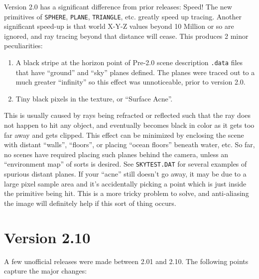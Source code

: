 Version 2.0 has a significant difference from prior releases: Speed!
The new primitives of {\tt SPHERE},
{\tt PLANE}, {\tt TRIANGLE}, etc.
greatly speed up tracing. Another
significant speed-up is that world
X-Y-Z values beyond 10 Million or so are ignored, and ray tracing
beyond that distance will cease.  This produces 2 minor peculiarities:

\begin{enumerate}
\item A black stripe at the horizon point of Pre-2.0 scene description
{\tt .data} files that have ``ground'' and ``sky'' planes defined.  The
planes were traced out to a much greater ``infinity'' so this effect was
unnoticeable, prior to version 2.0.
\item Tiny black pixels in the texture, or ``Surface Acne''.
\end{enumerate}

This is usually caused by rays being refracted or reflected such that
the ray does not happen to hit any object, and eventually becomes
black in color as it gets too far away and gets clipped.  This effect
can be minimized by enclosing the scene with distant ``walls'',
``floors'', or placing ``ocean floors'' beneath water, etc.  So far, no
scenes have required placing such planes behind the camera, unless an
``environment map'' of sorts is desired.  See {\tt SKYTEST.DAT} for several
examples of spurious distant planes.  If your ``acne'' still doesn't go
away, it may be due to a large pixel sample area and it's accidentally
picking a point which is just inside the primitive being hit.  This is
a more tricky problem to solve, and anti-aliasing the image will
definitely help if this sort of thing occurs. 

\section*{Version 2.10}

A few unofficial releases were made between 2.01 and 2.10.  The following
points capture the major changes:

